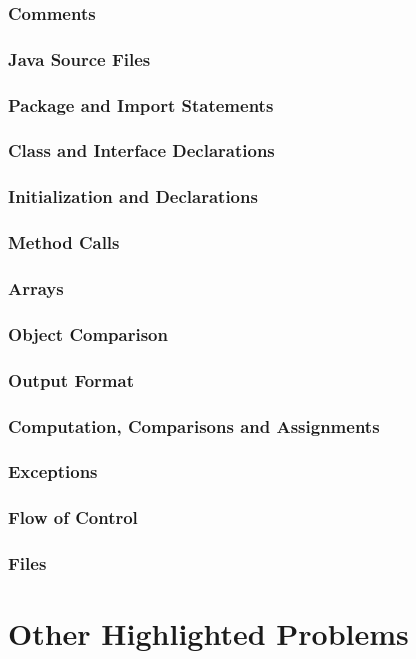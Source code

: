 \documentclass{article}
\begin{document}
\subsubsection{Comments}
\subsubsection{Java Source Files}
\subsubsection{Package and Import Statements}
\subsubsection{Class and Interface Declarations}
\subsubsection{Initialization and Declarations}
\subsubsection{Method Calls}
\subsubsection{Arrays}
\subsubsection{Object Comparison}
\subsubsection{Output Format}
\subsubsection{Computation, Comparisons and Assignments}
\subsubsection{Exceptions}
\subsubsection{Flow of Control}
\subsubsection{Files}

\section{Other Highlighted Problems}
	
\end{document}
